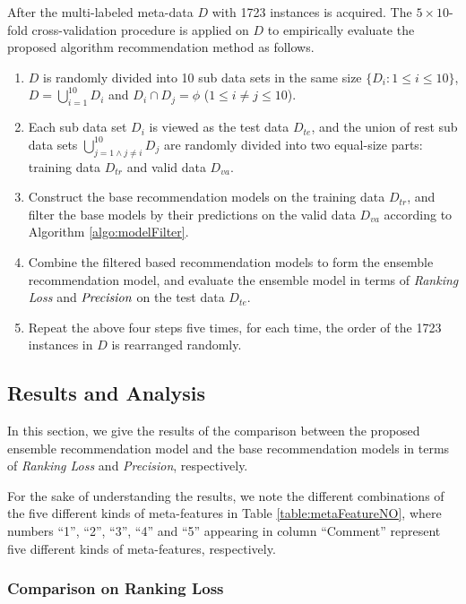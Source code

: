 \documentclass[acmsmall]{acmart}
\begin{document}
After the multi-labeled meta-data $D$ with 1723 instances is
acquired. The $5\times 10$-fold cross-validation procedure is
applied on $D$ to empirically evaluate the proposed algorithm
recommendation method as follows.
\begin{enumerate}
	\item $D$ is randomly divided into 10 sub data sets in the
	same size $\{D_{i}: 1\leq i\leq 10\}$, $D = \bigcup_{i=1}^{10} D_{i}$ and
	$D_{i}\cap D_{j} = \phi$ ($1\leq i\neq j\leq 10$).
	\item Each sub data set $D_{i}$ is viewed as the test data
	$D_{te}$, and the union of rest sub data sets $\bigcup_{j=1\wedge j\neq i}^{10} D_{j}$
	are randomly divided into two equal-size parts: training data $D_{tr}$ and
	valid data $D_{va}$.
	\item Construct the base recommendation models on the training
	data $D_{tr}$, and filter the base models by their predictions
	on the valid data $D_{va}$ according to Algorithm
	\ref{algo:modelFilter}.
	\item Combine the filtered based recommendation models to form
	the ensemble recommendation model, and evaluate the ensemble
	model in terms of \emph{Ranking Loss} and $\emph{Precision}$ on
	the test data $D_{te}$.
	\item Repeat the above four steps five times, for each time, the
	order of the 1723 instances in $D$ is rearranged randomly.
\end{enumerate}

\subsection{Results and Analysis}\label{subsec:result}

In this section, we give the results of the comparison between the
proposed ensemble recommendation model and the base recommendation
models in terms of \emph{Ranking Loss}  and \emph{Precision},
respectively.

For the sake of understanding the results, we note the different
combinations of the five different kinds of meta-features in Table
\ref{table:metaFeatureNO}, where numbers ``1'', ``2'', ``3'', ``4''
and ``5'' appearing in column ``Comment'' represent five different
kinds of meta-features, respectively.

\subsubsection{Comparison on Ranking Loss}
\end{document}
